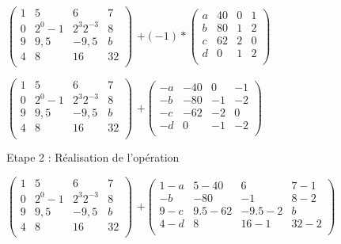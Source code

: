 \vspace{3mm} %
$
\begin{pmatrix}
  1 & 5 & 6 & 7 \\
  0 & 2^{0}-1 & 2^{3}2^{-3} & 8 \\
  9 & 9,5 & -9,5 & b \\
  4 & 8 & 16 & 32 \\
\end{pmatrix}
$
\vspace{5mm} %
$
+(-1)*
\begin{pmatrix}
  a & 40 & 0 & 1 \\
  b & 80 & 1 & 2 \\
  c & 62 & 2 & 0 \\
  d & 0  & 1 & 2 \\
\end{pmatrix}
$

\vspace{5mm} %

$
\begin{pmatrix}
  1 & 5 & 6 & 7 \\
  0 & 2^{0}-1 & 2^{3}2^{-3} & 8 \\
  9 & 9,5 & -9,5 & b \\
  4 & 8 & 16 & 32 \\
\end{pmatrix}
$
\vspace{5mm} %
$
+
\begin{pmatrix}
  -a & -40 & 0 & -1 \\
  -b & -80 & -1 & -2 \\
  -c & -62 & -2 & 0 \\
  -d & 0  & -1 & -2 \\
\end{pmatrix}
$

Etape 2 : Réalisation de l'opération \\

\vspace{5mm} %

$
\begin{pmatrix}
  1 & 5 & 6 & 7 \\
  0 & 2^{0}-1 & 2^{3}2^{-3} & 8 \\
  9 & 9,5 & -9,5 & b \\
  4 & 8 & 16 & 32 \\
\end{pmatrix}
$
\vspace{5mm} %
$
+
\begin{pmatrix}
  1-a & 5-40 & 6 & 7-1 \\
  -b & -80 & -1 & 8-2 \\
  9-c & 9.5-62 & -9.5-2 & b \\
  4-d & 8  & 16-1 & 32-2 \\
\end{pmatrix}
$

